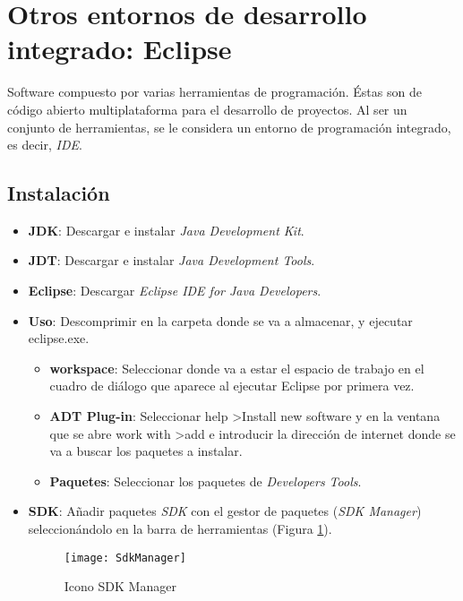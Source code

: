 	\section{Otros entornos de desarrollo integrado: Eclipse}
	Software compuesto por varias herramientas de programación. Éstas son de código abierto multiplataforma para el desarrollo de proyectos. Al ser un conjunto de herramientas, se le considera un entorno de programación integrado, es decir, {\it IDE}.
	
	\subsection{Instalación}
	\begin{itemize}
		\item {\bf JDK}: Descargar e instalar {\it Java Development Kit}\cite{17:jdk:online}.
		\item {\bf JDT}: Descargar e instalar {\it Java Development Tools}\cite{21:jdt:online}.
		\item {\bf Eclipse}: Descargar {\it Eclipse IDE for Java Developers}\cite{15:eclipse:online}.
		\item {\bf Uso}: Descomprimir en la carpeta donde se va a almacenar, y ejecutar {\ttfamily eclipse.exe}.
		\begin{itemize}
			\item {\bf workspace}: Seleccionar donde va a estar el espacio de trabajo en el cuadro de diálogo que aparece al ejecutar Eclipse por primera vez.
			\item {\bf ADT Plug-in}\cite{20:andoirdSDK:online}: Seleccionar {\ttfamily help \textgreater Install new software} y en la ventana que se abre {\ttfamily work with \textgreater add} e introducir la dirección de internet donde se va a buscar los paquetes a instalar.
			\item {\bf Paquetes}: Seleccionar los paquetes de {\it Developers Tools}.
		\end{itemize}
		\item {\bf SDK}: Añadir paquetes {\it SDK} con el gestor de paquetes ({\it SDK Manager}) seleccionándolo en la barra de herramientas (Figura \ref{fig:SdkManager}).
		\begin{figure}[h !]
			\centering
			\texttt{[image: SdkManager]}
			\caption{Icono SDK Manager}
			\label{fig:SdkManager}
		\end{figure}
	\end{itemize}
	

